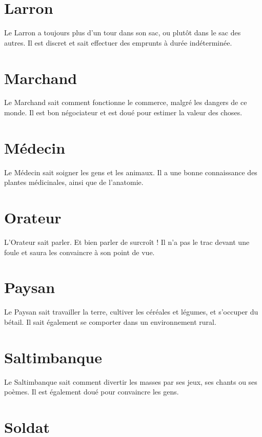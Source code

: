 \documentclass[a4paper,10pt,twoside,twocolumn,openany,bg=print,justified]{dndbook}
\begin{document}
\section*{Larron}

Le Larron a toujours plus d'un tour dans son sac, ou plutôt dans le sac des autres. Il est discret et sait effectuer des emprunts à durée indéterminée.

\section*{Marchand}

Le Marchand sait comment fonctionne le commerce, malgré les dangers de ce monde. Il est bon négociateur et est doué pour estimer la valeur des choses.

\section*{Médecin}

Le Médecin sait soigner les gens et les animaux. Il a une bonne connaissance des plantes médicinales, ainsi que de l'anatomie.

\section*{Orateur}

L'Orateur sait parler. Et bien parler de surcroît ! Il n'a pas le trac devant une foule et saura les convaincre à son point de vue.

\section*{Paysan}

Le Paysan sait travailler la terre, cultiver les céréales et légumes, et s'occuper du bétail. Il sait également se comporter dans un environnement rural.

\section*{Saltimbanque}

Le Saltimbanque sait comment divertir les masses par ses jeux, ses chants ou ses poèmes. Il est également doué pour convaincre les gens.

\section*{Soldat}
\end{document}
